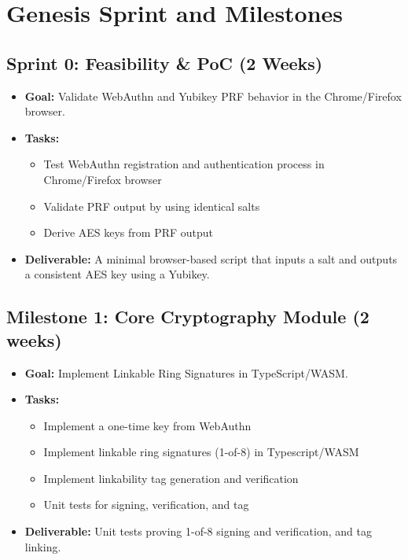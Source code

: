 \documentclass[letterpaper,11pt]{article}
\begin{document}
\section{Genesis Sprint and Milestones}

\subsection{Sprint 0: Feasibility \& PoC (2 Weeks)}
\begin{itemize}
    \item \textbf{Goal:} Validate WebAuthn and Yubikey PRF behavior in the Chrome/Firefox browser.
    \item \textbf{Tasks:}
    \begin{itemize}
        \item Test WebAuthn registration and authentication process in Chrome/Firefox browser
        \item Validate PRF output by using identical salts
        \item Derive AES keys from PRF output
    \end{itemize}
    \item \textbf{Deliverable:} A minimal browser-based script that inputs a salt and outputs a consistent AES key using a Yubikey.
\end{itemize}

\subsection{Milestone 1: Core Cryptography Module (2 weeks)}
\begin{itemize}
    \item \textbf{Goal:} Implement Linkable Ring Signatures in TypeScript/WASM.
    \item \textbf{Tasks:}
    \begin{itemize}
        \item Implement a one-time key from WebAuthn
        \item Implement linkable ring signatures (1-of-8) in Typescript/WASM
        \item Implement linkability tag generation and verification
        \item Unit tests for signing, verification, and tag
    \end{itemize}
    \item \textbf{Deliverable:} Unit tests proving 1-of-8 signing and verification, and tag linking.
\end{itemize}
\end{document}
